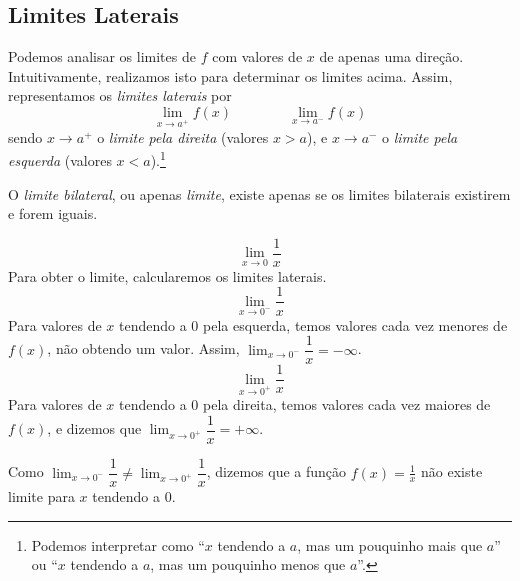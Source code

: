 \subsection{Limites Laterais}
Podemos analisar os limites de $f$ com valores de $x$ de apenas uma direção. Intuitivamente, realizamos isto para determinar os limites acima. Assim, representamos os \emph{limites laterais} por
\[\displaystyle\lim_{x\rightarrow a^+}f(x) \qquad \qquad \displaystyle\lim_{x\rightarrow a^-}f(x)\]
sendo $x\rightarrow a^+$ o \emph{limite pela direita} (valores $x>a$), e $x \rightarrow a^-$ o \emph{limite pela esquerda} (valores $x<a$).\footnote{Podemos interpretar como ``$x$ tendendo a $a$, mas um pouquinho mais que $a$'' ou ``$x$ tendendo a $a$, mas um pouquinho menos que $a$''.}\par 
O \emph{limite bilateral}, ou apenas \emph{limite}, existe apenas se os limites bilaterais existirem e forem iguais.
\begin{exemplo}
\[\displaystyle\lim_{x \rightarrow 0}\dfrac{1}{x}\]
Para obter o limite, calcularemos os limites laterais.
\[\displaystyle\lim_{x \rightarrow 0^-}\dfrac{1}{x}\]
Para valores de $x$ tendendo a $0$ pela esquerda, temos valores cada vez menores de $f(x)$, não obtendo um valor. Assim, $\lim_{x \rightarrow 0^-}\dfrac{1}{x}=-\infty$.
\[\displaystyle\lim_{x \rightarrow 0^+}\dfrac{1}{x}\]
Para valores de $x$ tendendo a $0$ pela direita, temos valores cada vez maiores de $f(x)$, e dizemos que $\lim_{x \rightarrow 0^+}\dfrac{1}{x}=+\infty$.\par 
Como $\lim_{x \rightarrow 0^-}\dfrac{1}{x} \neq \lim_{x \rightarrow 0^+}\dfrac{1}{x}$, dizemos que a função $f(x)=\frac{1}{x}$ não existe limite para $x$ tendendo a $0$.
\end{exemplo}

